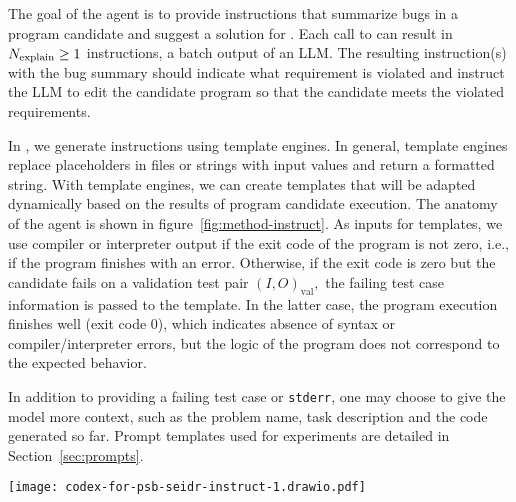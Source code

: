 The goal of the \instruct{} agent is to provide instructions that summarize bugs in a program candidate and suggest a solution for \debugmodel{}. 
Each call to \textmodel{} can result in $N_\text{explain}{}\ge1$ instructions, a batch output of an LLM.
The resulting instruction(s) with the bug summary should indicate what requirement is violated and instruct the LLM to edit the candidate program so that the candidate meets the violated requirements. 

In \method{}, we generate instructions using template engines. 
In general, template engines replace placeholders in files or strings with input values and return a formatted string. 
With template engines, we can create templates that will be adapted dynamically based on the results of program candidate execution. 
The anatomy of the \instruct{} agent is shown in figure~\ref{fig:method-instruct}.
As inputs for templates, we use compiler or interpreter output if the exit code of the program is not zero, i.e., if the program finishes with an error.
Otherwise, if the exit code is zero but the candidate fails on a validation test pair $\left( I, O\right)_\text{val},$ the failing test case information is passed to the template. 
In the latter case, the program execution finishes well (exit code 0), which indicates absence of syntax or compiler/interpreter errors, but the logic of the program does not correspond to the expected behavior. 

In addition to providing a failing test case or \texttt{stderr}, one may choose to give the model \textmodel{} more context, such as the problem name, task description and the code generated so far. 
Prompt templates used for experiments are detailed in Section~\ref{sec:prompts}.

\begin{figure*}
    \centering
    \texttt{[image: codex-for-psb-seidr-instruct-1.drawio.pdf]}
    \caption{\instruct{} agent.}
    \label{fig:method-instruct}
    \vspace*{-3ex}
\end{figure*}


